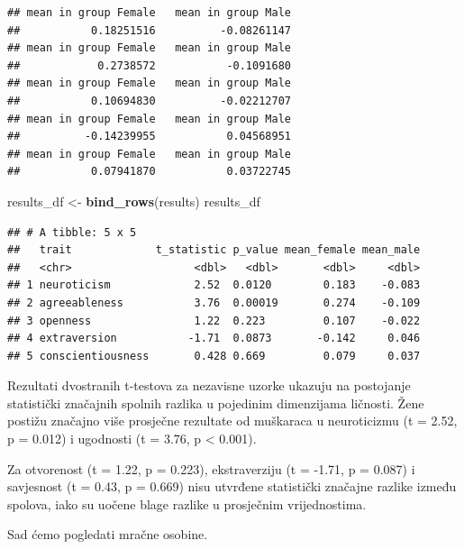 \documentclass[
]{article}
\newenvironment{Shaded}{\begin{snugshade}}{\end{snugshade}}
\newcommand{\FunctionTok}[1]{\textcolor[rgb]{0.13,0.29,0.53}{\textbf{#1}}}
\newcommand{\NormalTok}[1]{#1}
\newcommand{\OtherTok}[1]{\textcolor[rgb]{0.56,0.35,0.01}{#1}}
\begin{document}
\begin{verbatim}
## mean in group Female   mean in group Male 
##           0.18251516          -0.08261147 
## mean in group Female   mean in group Male 
##            0.2738572           -0.1091680 
## mean in group Female   mean in group Male 
##           0.10694830          -0.02212707 
## mean in group Female   mean in group Male 
##          -0.14239955           0.04568951 
## mean in group Female   mean in group Male 
##           0.07941870           0.03722745
\end{verbatim}

\begin{Shaded}
\begin{Highlighting}[]
\NormalTok{results\_df }\OtherTok{\textless{}{-}} \FunctionTok{bind\_rows}\NormalTok{(results)}
\NormalTok{results\_df}
\end{Highlighting}
\end{Shaded}

\begin{verbatim}
## # A tibble: 5 x 5
##   trait             t_statistic p_value mean_female mean_male
##   <chr>                   <dbl>   <dbl>       <dbl>     <dbl>
## 1 neuroticism             2.52  0.0120        0.183    -0.083
## 2 agreeableness           3.76  0.00019       0.274    -0.109
## 3 openness                1.22  0.223         0.107    -0.022
## 4 extraversion           -1.71  0.0873       -0.142     0.046
## 5 conscientiousness       0.428 0.669         0.079     0.037
\end{verbatim}

Rezultati dvostranih t-testova za nezavisne uzorke ukazuju na postojanje
statistički značajnih spolnih razlika u pojedinim dimenzijama ličnosti.
Žene postižu značajno više prosječne rezultate od muškaraca u
neuroticizmu (t = 2.52, p = 0.012) i ugodnosti (t = 3.76, p \textless{}
0.001).

Za otvorenost (t = 1.22, p = 0.223), ekstraverziju (t = -1.71, p =
0.087) i savjesnost (t = 0.43, p = 0.669) nisu utvrđene statistički
značajne razlike između spolova, iako su uočene blage razlike u
prosječnim vrijednostima.

Sad ćemo pogledati mračne osobine.
\end{document}

